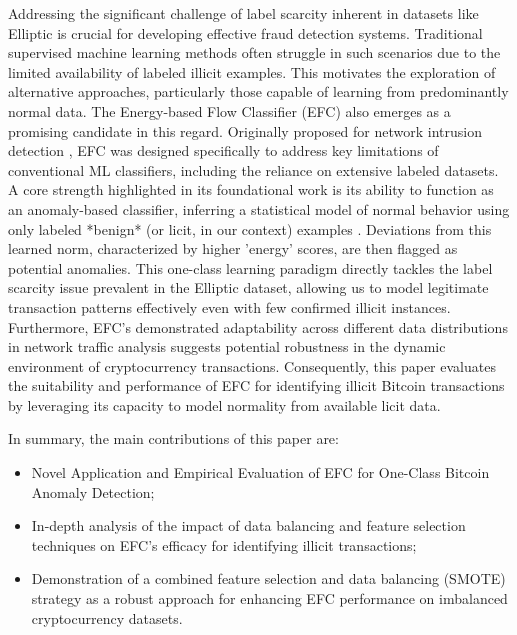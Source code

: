 \documentclass[12pt]{article}
\begin{document}
Addressing the significant challenge of label scarcity inherent in datasets like Elliptic is crucial for developing effective
fraud detection systems. Traditional supervised machine learning methods often struggle in such scenarios due to the limited
availability of labeled illicit examples. This motivates the exploration of alternative approaches, particularly those capable
of learning from predominantly normal data. The Energy-based Flow Classifier (EFC) also emerges as a promising candidate
in this regard. Originally proposed for network intrusion detection \cite{pontes2019, souza2022novelopensetenergybased},
EFC was designed specifically to address key limitations of conventional ML classifiers, including the reliance on extensive
labeled datasets. A core strength highlighted in its foundational work is its ability to function as an anomaly-based classifier,
inferring a statistical model of normal behavior using only labeled *benign* (or licit, in our context) examples
\cite{souza2022novelopensetenergybased}. Deviations from this learned norm, characterized by higher 'energy' scores, are
then flagged as potential anomalies. This one-class learning paradigm directly tackles the label scarcity issue prevalent
in the Elliptic dataset, allowing us to model legitimate transaction patterns effectively even with few confirmed illicit
instances. Furthermore, EFC's demonstrated adaptability across different data distributions in network traffic analysis
suggests potential robustness in the dynamic environment of cryptocurrency transactions. Consequently, this paper evaluates
the suitability and performance of EFC for identifying illicit Bitcoin transactions by leveraging its capacity to model
normality from available licit data.

In summary, the main contributions of this paper are:

\begin{itemize}
    \item Novel Application and Empirical Evaluation of EFC for One-Class Bitcoin Anomaly Detection;
    \item In-depth analysis of the impact of data balancing and feature selection techniques on EFC's efficacy for
    identifying illicit transactions;
    \item Demonstration of a combined feature selection and data balancing (SMOTE) strategy as a robust approach for enhancing
    EFC performance on imbalanced cryptocurrency datasets.
\end{itemize}
\end{document}
